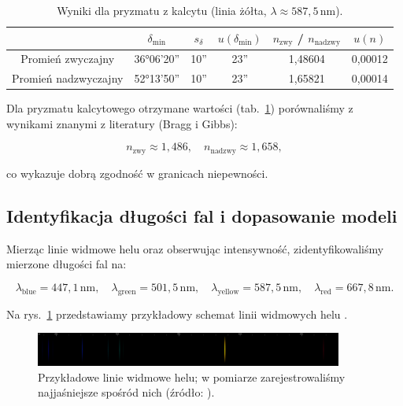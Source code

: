 \documentclass[12pt]{article}
\begin{document}
\begin{table}[H]
    \centering
    \begin{tabular}{c|ccccc}
        \toprule
        & $\delta_{\mathrm{min}}$ & $s_{\delta}$ & $u(\delta_{\mathrm{min}})$ & $n_{\mathrm{zwy}}$ / $n_{\mathrm{nadzwy}}$ & $u(n)$ \\
        \midrule
        Promień zwyczajny    & 36°06'20'' & 10'' & 23'' & 1{,}48604 & 0{,}00012 \\
        Promień nadzwyczajny & 52°13'50'' & 10'' & 23'' & 1{,}65821 & 0{,}00014 \\
        \bottomrule
    \end{tabular}
    \caption{Wyniki dla pryzmatu z kalcytu (linia żółta, $\lambda \approx 587{,}5\,\mathrm{nm}$).}
    \label{tab:kalcyt_tabela}
\end{table}

\noindent
Dla pryzmatu kalcytowego otrzymane wartości (tab.~\ref{tab:kalcyt_tabela}) porównaliśmy z wynikami znanymi z literatury \cite{kalcyt} (Bragg i Gibbs): 

\[
    n_{\mathrm{zwy}} \approx 1{,}486, \quad n_{\mathrm{nadzwy}} \approx 1{,}658, 
\]

co wykazuje dobrą zgodność w granicach niepewności.

\subsection{Identyfikacja długości fal i dopasowanie modeli}

Mierząc linie widmowe helu \cite{linie_1,linie_2} oraz obserwując intensywność, zidentyfikowaliśmy mierzone długości fal na: 

\[
    \lambda_{\mathrm{blue}} = 447{,}1\,\mathrm{nm}, \quad
    \lambda_{\mathrm{green}} = 501{,}5\,\mathrm{nm}, \quad
    \lambda_{\mathrm{yellow}} = 587{,}5\,\mathrm{nm}, \quad
    \lambda_{\mathrm{red}} = 667{,}8\,\mathrm{nm}.
\]

Na rys.~\ref{fig:linie_helu} przedstawiamy przykładowy schemat linii widmowych helu \cite{obraz_linie}.

\begin{figure}[H]
    \centering
    \includegraphics[width=0.90\textwidth]{He I}
    \caption{Przykładowe linie widmowe helu; w pomiarze zarejestrowaliśmy najjaśniejsze spośród nich (źródło: \cite{obraz_linie}).}
    \label{fig:linie_helu}
\end{figure}
\end{document}
